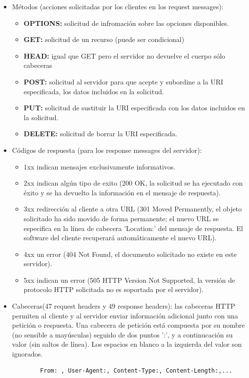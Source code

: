 \documentclass[a4paper,11pt]{article}
\begin{document}
\begin{itemize}
\item Métodos (acciones solicitadas por los clientes en los request messages):
	\begin{itemize}
		\item \textbf{OPTIONS:} solicitud de infromación sobre las opciones disponibles.
		\item \textbf{GET:} solicitud de un recurso (puede ser condicional)
		\item \textbf{HEAD:} igual que GET pero el servidor no devuelve el cuerpo sólo cabeceras
		\item \textbf{POST:} solicitud al servidor para que acepte y subordine a la URI especificada, los datos incluidos en la solicitud.
		\item \textbf{PUT:} solicitud de sustituir la URI especificada con los datos incluidos en la solicitud.
		\item \textbf{DELETE:} solicitud de borrar la URI especificada.
	\end{itemize}
	
\item Códigos de respuesta (para los response messages del servidor):
	\begin{itemize}
		\item 1xx indican mensajes exclusivamente informativos. 
		\item 2xx indican algún tipo de exito (200 OK, la solicitud se ha ejecutado con éxito y se ha devuelto la información en el mensaje de respuesta).
		\item 3xx redirección al cliente a otra URL  (301 Moved Permanently, el objeto solicitado ha sido movido de forma permanente; el nuevo URL se especifica en la línea de cabecera 'Location:' del mensaje de respuesta. El software del cliente recuperará automáticamente el nuevo URL).
		\item 4xx un error  (404 Not Found, el documento solicitado no existe en este servidor).
		\item 5xx indican un error (505 HTTP Version Not Supported, la versión de protocolo HTTP solicitada no es soportada por el servidor).
	\end{itemize}
	
\item Cabeceras(47 request headers y 49 response headers): las cabeceras HTTP permiten al cliente y al servidor enviar información adicional junto con una petición o respuesta. Una cabecera de petición está compuesta por su nombre (no sensible a mayúsculas) seguido de dos puntos ':', y a continucación su valor (sin saltos de línea). Los espacios en blanco a la izquierda del valor son ignorados.
	\begin{verbatim}
		From: , User-Agent:, Content-Type:, Content-Length:,...
	\end{verbatim}
\end{itemize}
\end{document}
